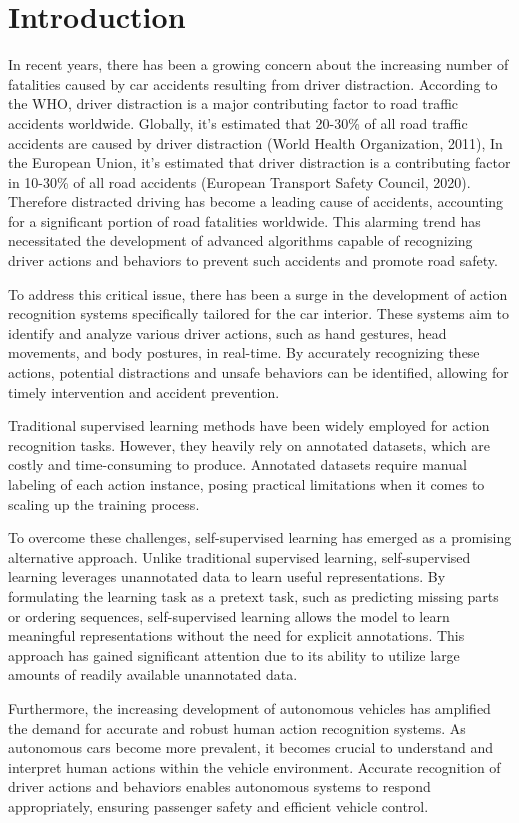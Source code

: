 \chapter{Introduction}
In recent years, there has been a growing concern about the increasing number of fatalities caused by car accidents resulting from driver distraction. According to the WHO, driver distraction is a major contributing factor to road traffic accidents worldwide. Globally, it's estimated that 20-30\% of all road traffic accidents are caused by driver distraction (World Health Organization, 2011), In the European Union, it's estimated that driver distraction is a contributing factor in 10-30\% of all road accidents (European Transport Safety Council, 2020). Therefore distracted driving has become a leading cause of accidents, accounting for a significant portion of road fatalities worldwide. This alarming trend has necessitated the development of advanced algorithms capable of recognizing driver actions and behaviors to prevent such accidents and promote road safety.

To address this critical issue, there has been a surge in the development of action recognition systems specifically tailored for the car interior. These systems aim to identify and analyze various driver actions, such as hand gestures, head movements, and body postures, in real-time. By accurately recognizing these actions, potential distractions and unsafe behaviors can be identified, allowing for timely intervention and accident prevention.

Traditional supervised learning methods have been widely employed for action recognition tasks. However, they heavily rely on annotated datasets, which are costly and time-consuming to produce. Annotated datasets require manual labeling of each action instance, posing practical limitations when it comes to scaling up the training process.

To overcome these challenges, self-supervised learning has emerged as a promising alternative approach. Unlike traditional supervised learning, self-supervised learning leverages unannotated data to learn useful representations. By formulating the learning task as a pretext task, such as predicting missing parts or ordering sequences, self-supervised learning allows the model to learn meaningful representations without the need for explicit annotations. This approach has gained significant attention due to its ability to utilize large amounts of readily available unannotated data.

Furthermore, the increasing development of autonomous vehicles has amplified the demand for accurate and robust human action recognition systems. As autonomous cars become more prevalent, it becomes crucial to understand and interpret human actions within the vehicle environment. Accurate recognition of driver actions and behaviors enables autonomous systems to respond appropriately, ensuring passenger safety and efficient vehicle control.

